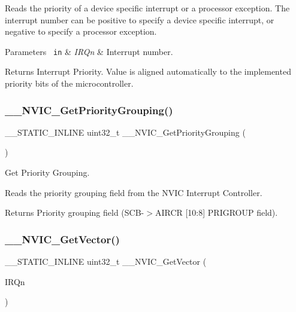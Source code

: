 Reads the priority of a device specific interrupt or a processor exception. The interrupt number can be positive to specify a device specific interrupt, or negative to specify a processor exception. 
\begin{DoxyParams}[1]{Parameters}
\mbox{\texttt{ in}}  & {\em I\+R\+Qn} & Interrupt number. \\
\hline
\end{DoxyParams}
\begin{DoxyReturn}{Returns}
Interrupt Priority. Value is aligned automatically to the implemented priority bits of the microcontroller. 
\end{DoxyReturn}
\mbox{\label{group___c_m_s_i_s___core___n_v_i_c_functions_ga9b894af672df4373eb637f8288845c05}} 
\subsubsection{\texorpdfstring{\_\_NVIC\_GetPriorityGrouping()}{\_\_NVIC\_GetPriorityGrouping()}}
{\footnotesize\ttfamily \+\_\+\+\_\+\+S\+T\+A\+T\+I\+C\+\_\+\+I\+N\+L\+I\+NE uint32\+\_\+t \+\_\+\+\_\+\+N\+V\+I\+C\+\_\+\+Get\+Priority\+Grouping (\begin{DoxyParamCaption}\item[{void}]{ }\end{DoxyParamCaption})}



Get Priority Grouping. 

Reads the priority grouping field from the N\+V\+IC Interrupt Controller. \begin{DoxyReturn}{Returns}
Priority grouping field (S\+C\+B-\/$>$A\+I\+R\+CR \mbox{[}10\+:8\mbox{]} P\+R\+I\+G\+R\+O\+UP field). 
\end{DoxyReturn}
\mbox{\label{group___c_m_s_i_s___core___n_v_i_c_functions_ga44b665d2afb708121d9b10c76ff00ee5}} 
\subsubsection{\texorpdfstring{\_\_NVIC\_GetVector()}{\_\_NVIC\_GetVector()}}
{\footnotesize\ttfamily \+\_\+\+\_\+\+S\+T\+A\+T\+I\+C\+\_\+\+I\+N\+L\+I\+NE uint32\+\_\+t \+\_\+\+\_\+\+N\+V\+I\+C\+\_\+\+Get\+Vector (\begin{DoxyParamCaption}\item[{I\+R\+Qn\+\_\+\+Type}]{I\+R\+Qn }\end{DoxyParamCaption})}



